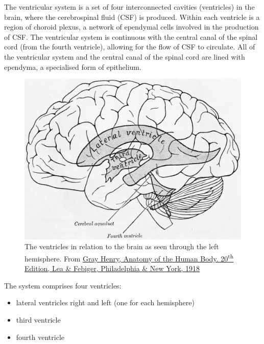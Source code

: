 The ventricular system is a set of four interconnected cavities (ventricles) in the brain, where the cerebrospinal fluid (CSF) is produced. Within each ventricle is a region of choroid plexus, a network of ependymal cells involved in the production of CSF. The ventricular system is continuous with the central canal of the spinal cord (from the fourth ventricle), allowing for the flow of CSF to circulate. All of the ventricular system and the central canal of the spinal cord are lined with ependyma, a specialised form of epithelium.



\begin{figure}

{\centering \includegraphics[width=0.7\linewidth]{./figures/cns/GrayAnat1918p829} 

}

\caption{The ventricles in relation to the brain as seen through the left hemisphere. From \href{https://archive.org/details/anatomyofhumanbo1918gray/page/n6/mode/2up}{Gray Henry, Anatomy of the Human Body. 20\textsuperscript{th} Edition, Lea \& Febiger, Philadelphia \& New York, 1918}}\label{fig:ventriclesbrain}
\end{figure}

The system comprises four ventricles:

\begin{itemize}
\tightlist
\item
  lateral ventricles right and left (one for each hemisphere)
\item
  third ventricle
\item
  fourth ventricle
\end{itemize}



